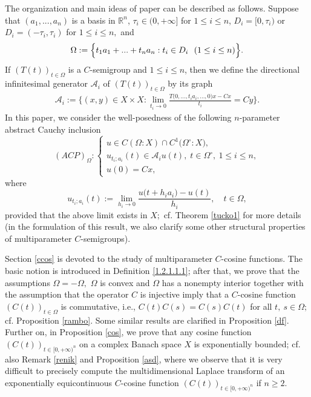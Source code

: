\documentclass{amsart}
\theoremstyle{definition}
\theoremstyle{remark}
\numberwithin{equation}{section}
\begin{document}
The organization and main ideas of paper can be described as follows. 
Suppose that $(a_{1},...,a_{n})$ is a basis in ${\mathbb R}^{n}$, $\tau_{i}\in (0,+\infty]$ for $1\leq i \leq n$, $D_{i}=[0,\tau_{i})$ or $D_{i}=(-\tau_{i},\tau_{i})$ for $1\leq i\leq n,$ and
\begin{align}\label{me1}
\Omega :=\Bigl\{ t_{1}a_{1}+...+t_{n}a_{n} : t_{i}\in D_{i}\ \ (1\leq i\leq n) \Bigr\}.
\end{align}
If $(T(t))_{t\in \Omega}$ is a $C$-semigroup and $1\leq i\leq n$, then we define the directional infinitesimal generator ${\mathcal A}_{i}$ of $(T(t))_{t\in \Omega}$ by its graph
\begin{align}\label{maww1}
{\mathcal A}_{i} :=\Biggl\{ ( x,y) \in X \times X : \lim_{t_{i}\rightarrow 0}\frac{T\bigl(0,...,t_{i}a_{i},...,0\bigr)x-Cx}{t_{i}}=Cy\Biggr\}.
\end{align}
In this paper, we consider the well-posedness of the following
$n$-parameter abstract Cauchy inclusion
\[ (ACP)_{\Omega}: \left\{
\begin{array}{l}
u\in C(\Omega : X)\cap C^1 \bigl(\Omega^{\circ} :X\bigr),\\
u_{t_{i};a_{i}}(t)\in {\mathcal A}_{i}u(t),\;t \in \Omega^{\circ},\ 1\leq i\leq n,\\
u(0)=Cx,
\end{array}
\right. \]
where
$$
u_{t_{i};a_{i}}(t):= \lim_{h_{i}\rightarrow 0}\frac{u\bigl(t+h_{i}a_{i} \bigr)-u(t)}{h_{i}} ,\quad t\in \Omega,
$$
provided that the above limit exists in $X;$ cf. Theorem \ref{tucko1} for more details (in the formulation of this result, we also clarify some other structural properties of multiparameter $C$-semigroups).

Section \ref{ccos} is devoted to the study of multiparameter $C$-cosine functions. The basic notion 
is introduced in Definition \ref{1.2.1.1.1}; after that, we prove that the assumptions $\Omega=-\Omega,$  $\Omega$ is convex and $\Omega$ has a nonempty interior together with the assumption that the operator $C$ is injective imply that a $C$-cosine function $(C(t))_{t\in \Omega}$ is commutative, i.e., $C(t)C(s)=C(s)C(t)$ for all $t,\ s\in \Omega ;$ cf. Proposition \ref{rambo}. Some similar results are clarified in Proposition \ref{df}. Further on, in Proposition \ref{cos}, we prove that any cosine function $(C(t))_{t\in [0,+\infty)^{n}}$ on a complex Banach space $X$ is exponentially bounded; cf. also Remark \ref{renik} and Proposition \ref{asd}, 
where we observe that it is very difficult to precisely compute the multidimensional Laplace transform of an exponentially equicontinuous $C$-cosine function $(C(t))_{t\in [0,+\infty)^{n}}$ if $n\geq 2$. 
\end{document}
